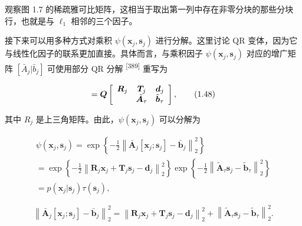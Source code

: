 观察图 1.7 的稀疏雅可比矩阵，这相当于取出第一列中存在非零分块的那些分块行，也就是与 $\ell_1$ 相邻的三个因子。

接下来可以用多种方式对乘积 $\psi(\pmb x_j,\pmb s_j)$ 进行分解。这里讨论 QR 变体，因为它与线性化因子的联系更加直接。具体而言，与乘积因子 $\psi(\pmb x_j,\pmb s_j)$ 对应的增广矩阵 $[\bar A_j|\bar b_j]$ 可使用部分 QR 分解 \textsuperscript{[389]} 重写为

\begin{equation}
[ \bar {\boldsymbol {A}} _ {j} | \bar {\boldsymbol {b}} _ {j} ] = \boldsymbol {Q} \left[ \begin{array}{c c c} \boldsymbol {R} _ {j} & \boldsymbol {T} _ {j} & \boldsymbol {d} _ {j} \\ & \tilde {\boldsymbol {A}} _ {\tau} & \tilde {\boldsymbol {b}} _ {\tau} \end{array} \right],\tag{1.48}
\end{equation}

其中 $R_j$ 是上三角矩阵。由此，$\psi(\pmb x_j,\pmb s_j)$ 可以分解为

\begin{equation}
\begin{array}{l} \psi (\boldsymbol {x} _ {j}, \boldsymbol {s} _ {j}) = \exp \left\{- \frac {1}{2} \left\| \bar {\boldsymbol {A}} _ {j} [ \boldsymbol {x} _ {j}; \boldsymbol {s} _ {j} ] - \bar {\boldsymbol {b}} _ {j} \right\| _ {2} ^ {2} \right\} \\ = \exp \left\{- \frac {1}{2} \left\| \boldsymbol {R} _ {j} \boldsymbol {x} _ {j} + \boldsymbol {T} _ {j} \boldsymbol {s} _ {j} - \boldsymbol {d} _ {j} \right\| _ {2} ^ {2} \right\} \exp \left\{- \frac {1}{2} \left\| \tilde {\boldsymbol {A}} _ {\tau} \boldsymbol {s} _ {j} - \tilde {\boldsymbol {b}} _ {\tau} \right\| _ {2} ^ {2} \right\} \\ = p (\boldsymbol {x} _ {j} | \boldsymbol {s} _ {j}) \tau (\boldsymbol {s} _ {j}), \end{array}\tag{1.49a}
\end{equation}

\begin{equation}
\left\| \bar {\boldsymbol {A}} _ {j} [ \boldsymbol {x} _ {j}; \boldsymbol {s} _ {j} ] - \bar {\boldsymbol {b}} _ {j} \right\| _2^2 = \left\| \boldsymbol {R}_j\boldsymbol{x}_j+\boldsymbol{T}_j\boldsymbol{s}_j-\boldsymbol{d}_j\right\|_2^2 + \left\|\tilde{\boldsymbol A}_\tau\boldsymbol{s}_j-\tilde{\boldsymbol b}_\tau\right\|_2^2.\tag{1.49b}
\end{equation}


